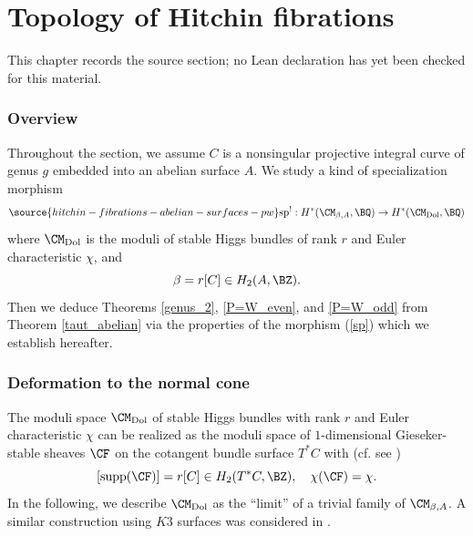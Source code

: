 \chapter{Topology of Hitchin fibrations}
\label{hitchin-fibrations-abelian-surfaces-pw-chapter-05}

\begin{remark}
\label{hitchin-fibrations-abelian-surfaces-pw-chapter-05-source}
This chapter records the source section; no Lean declaration has yet been checked for this material.
\notready
\end{remark}

\label{se4}

\subsection{Overview} Throughout the section, we assume $C$ is a nonsingular projective integral curve of genus $g$ embedded into an abelian surface $A$. We study {a kind of} specialization morphism
\begin{equation}\label{sp}
\source{hitchin-fibrations-abelian-surfaces-pw}
    \mathrm{sp}^!: H^*(\CM_{\beta, A}, \BQ) \to H^*(\CM_{\mathrm{Dol}}, \BQ)
\end{equation}
where $\CM_{\mathrm{Dol}}$ is the moduli of stable Higgs bundles of rank $r$ and Euler characteristic $\chi$, and
\[
\beta = r[C] \in H_2(A, \BZ).
\]
Then we deduce Theorems \ref{genus_2}, \ref{P=W_even}, and \ref{P=W_odd} from Theorem \ref{taut_abelian} via the properties of the  morphism (\ref{sp}) which we establish hereafter.

\subsection{Deformation to the normal cone}\label{Section 4.2}

The moduli space $\CM_{\mathrm{Dol}}$ of stable Higgs bundles with rank $r$ and Euler characteristic $\chi$ can be realized as the moduli space of $1$-dimensional Gieseker-stable sheaves $\CF$ on the cotangent bundle  surface $T^*C$ with (cf. see \cite{BNR})
\[
 [\mathrm{supp}(\CF)] = r[C] \in H_2(T^*C, \BZ), \quad \chi(\CF) = \chi.
\]
In the following, we describe $\CM_{\mathrm{Dol}}$ as the ``limit'' of a trivial family of $\CM_{\beta,A}$. A similar construction using $K3$ surfaces was considered in \cite{DLL}.


